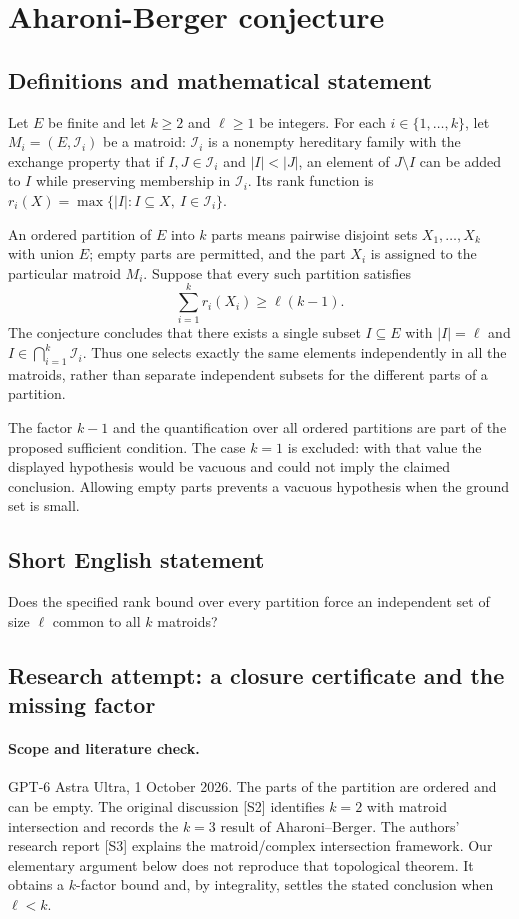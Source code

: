 \documentclass[11pt,a4paper]{article}
\begin{document}
\section*{Aharoni-Berger conjecture}\label{statement}

\subsection{Definitions and mathematical statement}
Let $E$ be finite and let $k\ge2$ and $\ell\ge1$ be integers.
For each $i\in\{1,\ldots,k\}$, let $M_i=(E,\mathcal I_i)$ be a matroid:
$\mathcal I_i$ is a nonempty hereditary family with the exchange property
that if $I,J\in\mathcal I_i$ and $|I|<|J|$, an element of $J\setminus I$
can be added to $I$ while preserving membership in $\mathcal I_i$.
Its rank function is
$r_i(X)=\max\{|I|:I\subseteq X,\ I\in\mathcal I_i\}$.

An ordered partition of $E$ into $k$ parts means pairwise disjoint sets
$X_1,\ldots,X_k$ with union $E$; empty parts are permitted, and the part
$X_i$ is assigned to the particular matroid $M_i$.
Suppose that every such partition satisfies
\[
 \sum_{i=1}^k r_i(X_i)\ge\ell(k-1).
\]
The conjecture concludes that there exists a single subset $I\subseteq E$
with $|I|=\ell$ and $I\in\bigcap_{i=1}^k\mathcal I_i$.
Thus one selects exactly the same elements independently in all the
matroids, rather than separate independent subsets for the different
parts of a partition.

The factor $k-1$ and the quantification over all ordered partitions are
part of the proposed sufficient condition. The case $k=1$ is excluded:
with that value the displayed hypothesis would be vacuous and could
not imply the claimed conclusion. Allowing empty parts prevents a
vacuous hypothesis when the ground set is small.
\subsection{Short English statement}
Does the specified rank bound over every partition force an independent set of size $\ell$ common to all $k$ matroids?
\subsection{Research attempt: a closure certificate and the missing factor}
\paragraph{Scope and literature check.}
GPT-6 Astra Ultra, 1 October 2026. The parts of the partition are
ordered and can be empty. The original discussion [S2] identifies
$k=2$ with matroid intersection and records the $k=3$ result of
Aharoni--Berger. The authors' research report [S3] explains the
matroid/complex intersection framework. Our elementary argument below
does not reproduce that topological theorem. It obtains a $k$-factor
bound and, by integrality, settles the stated conclusion when $\ell<k$.
\end{document}
